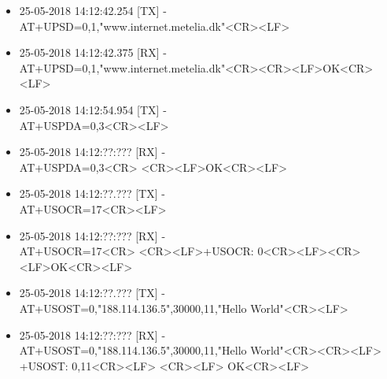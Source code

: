 \begin{itemize}
	\item 25-05-2018 14:12:42.254 [TX] -\\
	AT+UPSD=0,1,"www.internet.metelia.dk"<CR><LF>
	\item 25-05-2018 14:12:42.375 [RX] -\\
	AT+UPSD=0,1,"www.internet.metelia.dk"<CR>\newline <CR><LF>\newline OK<CR><LF>
	\item 25-05-2018 14:12:54.954 [TX] -\\
	AT+USPDA=0,3<CR><LF>
	\item 25-05-2018 14:12:??:??? [RX] -\\
	AT+USPDA=0,3<CR> \newline <CR><LF>\newline OK<CR><LF>
	\item 25-05-2018 14:12:??.??? [TX] -\\
	AT+USOCR=17<CR><LF>
	\item 25-05-2018 14:12:??:??? [RX] -\\
	AT+USOCR=17<CR> \newline <CR><LF>\newline +USOCR: 0<CR><LF>\newline <CR><LF>\newline OK<CR><LF>
	\item 25-05-2018 14:12:??.??? [TX] -\\
	AT+USOST=0,"188.114.136.5",30000,11,"Hello World"<CR><LF>
	\item 25-05-2018 14:12:??:??? [RX] -\\
	AT+USOST=0,"188.114.136.5",30000,11,"Hello World"<CR>\newline <CR><LF> \newline +USOST: 0,11<CR><LF> \newline <CR><LF> \newline OK<CR><LF>
\end{itemize}
